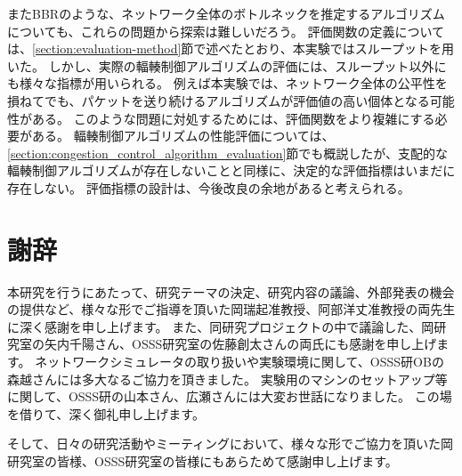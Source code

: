 \documentclass[a4paper,11pt]{jreport}
\newcommand{\secref}[1]{\ref{#1}節}
\begin{document}
またBBRのような、ネットワーク全体のボトルネックを推定するアルゴリズムについても、これらの問題から探索は難しいだろう。
評価関数の定義については、\secref{section:evaluation-method}で述べたとおり、本実験ではスループットを用いた。
しかし、実際の輻輳制御アルゴリズムの評価には、スループット以外にも様々な指標が用いられる。
例えば本実験では、ネットワーク全体の公平性を損ねてでも、パケットを送り続けるアルゴリズムが評価値の高い個体となる可能性がある。
このような問題に対処するためには、評価関数をより複雑にする必要がある。
輻輳制御アルゴリズムの性能評価については、\secref{section:congestion_control_algorithm_evaluation}でも概説したが、支配的な輻輳制御アルゴリズムが存在しないことと同様に、決定的な評価指標はいまだに存在しない。
評価指標の設計は、今後改良の余地があると考えられる。

\newpage

\chapter*{謝辞}

本研究を行うにあたって、研究テーマの決定、研究内容の議論、外部発表の機会の提供など、様々な形でご指導を頂いた岡瑞起准教授、阿部洋丈准教授の両先生に深く感謝を申し上げます。
また、同研究プロジェクトの中で議論した、岡研究室の矢内千陽さん、OSSS研究室の佐藤創太さんの両氏にも感謝を申し上げます。
ネットワークシミュレータの取り扱いや実験環境に関して、OSSS研OBの森越さんには多大なるご協力を頂きました。
実験用のマシンのセットアップ等に関して、OSSS研の山本さん、広瀬さんには大変お世話になりました。
この場を借りて、深く御礼申し上げます。

そして、日々の研究活動やミーティングにおいて、様々な形でご協力を頂いた岡研究室の皆様、OSSS研究室の皆様にもあらためて感謝申し上げます。

\newpage

\renewcommand{\bibname}{参考文献}




\appendix
\end{document}
